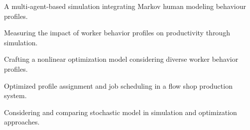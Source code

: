 \documentclass[fina,12pt, 3p, times]{elsarticle}
\begin{document}
\begin{frontmatter}

\begin{highlights}
	\item A multi-agent-based simulation integrating Markov human modeling behaviour profiles. 
 \item Measuring the impact of worker behavior profiles on productivity through simulation.
\item Crafting a nonlinear optimization model considering diverse worker behavior profiles.
\item Optimized profile assignment and job scheduling in a flow shop production system.
\item Considering and comparing stochastic model in simulation and optimization approaches. 
\end{highlights}
\end{frontmatter}
\end{document}
